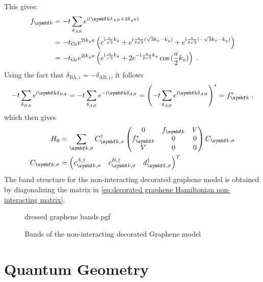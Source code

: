 \documentclass[../notes.tex]{subfiles}
\begin{document}
This gives:
\begin{align}
	f_{\vb{k}} &= -t \sum_{\delta_{AB}} e^{\iu (\vb{k} \delta_{AB} + 2 k_y a)} \\
	&= -t_{\mathrm{Gr}} e^{2 \iu k_y a} \left(
	e^{\iu \frac{a}{\sqrt{3}} k_y} +
	e^{\iu \frac{a}{2\sqrt{3}} (\sqrt{3} k_x - k_y)} +
	e^{\iu \frac{a}{2\sqrt{3}} (-\sqrt{3} k_x - k_y)} \right) \\
	&= -t_{\mathrm{Gr}} e^{2 \iu k_y a} \left(
	e^{\iu \frac{a}{\sqrt{3}} k_y} +
	2 e^{-\iu \frac{a}{2\sqrt{3}} k_y}
	\cos{(\frac{a}{2} k_x)} \right) \;.
\end{align}
Using the fact that \(\delta_{\mathrm{BA}, i} = -\delta_{\mathrm{AB}, i}\), it follows
\begin{align}
	-t \sum_{\delta_{BA}} e^{\iu \vb{k} \delta_{BA}} = -t \sum_{\delta_{AB}} e^{-\iu \vb{k} \delta_{AB}} = \left(-t \sum_{\delta_{AB}} e^{\iu \vb{k} \delta_{AB}}\right)^* = f_{\vb{k}}^* \;,
\end{align}
which then gives
\begin{align}
	H_0 &= \sum_{\vb{k}, \sigma} C_{\vb{k}, \sigma}^{\dagger}
	\begin{pmatrix}
		0 & f_{\vb{k}} & V \\
		f_{\vb{k}}^* & 0 & 0 \\
		V & 0 & 0
	\end{pmatrix} C_{\vb{k}, \sigma}
	\label{eq:decorated graphene Hamiltonian non-interacting matrix} \\
	 C_{\vb{k}, \sigma} &= \begin{pmatrix} c_{\vb{k}, \sigma}^{A, \dagger} & c_{\vb{k}, \sigma}^{B, \dagger} & d_{\vb{k}, \sigma}^{\dagger} \end{pmatrix}^T
\end{align}
The band structure for the non-interacting decorated graphene model is obtained by diagonalizing the matrix in \cref{eq:decorated graphene Hamiltonian non-interacting matrix}.
\begin{figure}[t]
	\centering
	 {dressed graphene bands.pgf}
	\caption{Bands of the non-interacting  decorated Graphene model}
	\label{fig:decorated graphene model non-interacting bands}
\end{figure}

\section{Quantum Geometry}

\end{document}
